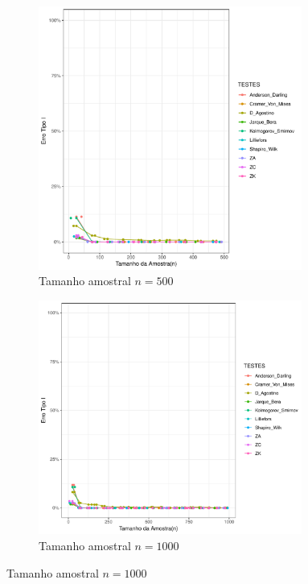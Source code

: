 \documentclass[a4paper,11pt]{article} %
\begin{document}
\begin{figure}[H]
    \vspace{0.5cm} %
    \begin{subfigure}[b]{0.45\textwidth}
        \centering
        \includegraphics[width=0.95\textwidth]{Distribuição Cauchy/Erro Tipo I/erro_tipo_I_cauchy_500.pdf}
        \caption{Tamanho amostral \(n = 500\)}
        \label{fig:cauchy_500}
    \end{subfigure}
    \hfill
    \begin{subfigure}[b]{0.45\textwidth}
        \centering
        \includegraphics[width=0.95\textwidth]{Distribuição Cauchy/Erro Tipo I/erro_tipo_I_cauchy_1000.pdf}
        \caption{Tamanho amostral \(n = 1000\)}
        \label{fig:cauchy_1000}
    \end{subfigure}
\end{figure}
\end{document}
